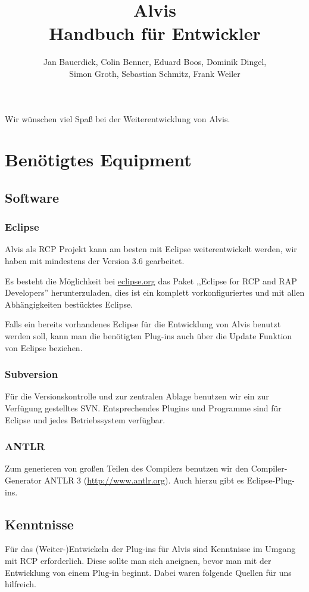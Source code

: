 \documentclass[10pt,a4paper,oneside]{scrbook}
\author{Jan Bauerdick,
Colin Benner,
Eduard Boos,
Dominik Dingel,\\
Simon Groth,
Sebastian Schmitz, 
Frank Weiler}
\title{Alvis\\Handbuch für Entwickler}
\begin{document}
\maketitle
\newpage
\tableofcontents
\newpage
Wir wünschen viel Spaß bei der Weiterentwicklung von Alvis.
\chapter{Benötigtes Equipment}
\section{Software}
\subsection{Eclipse}
Alvis als RCP Projekt kann am besten mit Eclipse weiterentwickelt werden, wir haben mit mindestens der Version 3.6 gearbeitet.

Es besteht die Möglichkeit bei \href{http://eclipse.org}{eclipse.org} das Paket ,,Eclipse for RCP and RAP Developers'' herunterzuladen, dies ist ein komplett vorkonfiguriertes und mit allen Abhängigkeiten bestücktes Eclipse.

Falls ein bereits vorhandenes Eclipse für die Entwicklung von Alvis benutzt werden soll, kann man die benötigten Plug-ins auch über die Update Funktion von Eclipse beziehen.

\subsection{Subversion}
Für die Versionskontrolle und zur zentralen Ablage benutzen wir ein zur Verfügung gestelltes SVN. Entsprechendes Plugins und Programme sind für Eclipse und jedes Betriebssystem verfügbar. 

\subsection{ANTLR}
Zum generieren von großen Teilen des Compilers benutzen wir den Compiler-Generator ANTLR 3 (\url{http://www.antlr.org}). Auch hierzu gibt es Eclipse-Plug-ins.

\section{Kenntnisse}
Für das (Weiter-)Entwickeln der Plug-ins für Alvis sind Kenntnisse im Umgang mit RCP erforderlich. Diese sollte man sich aneignen, bevor man mit der Entwicklung von einem Plug-in beginnt. Dabei waren folgende Quellen für uns hilfreich.
\end{document}
